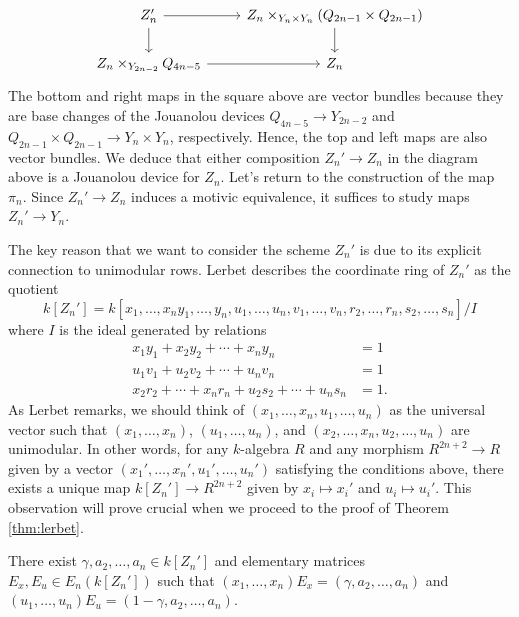 \[\begin{tikzcd}
	{Z_n'} & {Z_n \times_{Y_n \times Y_n}(Q_{2n-1} \times Q_{2n-1})} \\
	{Z_n\times_{Y_{2n-2}}Q_{4n-5}} & {Z_n}
	\arrow[from=1-1, to=1-2]
	\arrow[from=1-1, to=2-1]
	\arrow[from=1-2, to=2-2]
	\arrow[from=2-1, to=2-2]
\end{tikzcd}\]
The bottom and right maps in the square above are vector bundles because they are base changes of the Jouanolou devices $Q_{4n-5}\to Y_{2n-2}$ and $Q_{2n-1} \times Q_{2n-1} \to Y_n \times Y_n$, respectively. Hence, the top and left maps are also vector bundles. We deduce that either composition $Z_n' \to Z_n$ in the diagram above is a Jouanolou device for $Z_n$. Let's return to the construction of the map $\pi_n$. Since $Z_n' \to Z_n$ induces a motivic equivalence, it suffices to study maps $Z_n' \to Y_n$. 

The key reason that we want to consider the scheme $Z_n'$ is due to its explicit connection to unimodular rows. Lerbet \cite[pg. 27]{LERBET2024109415} describes the  coordinate ring of $Z_n'$ as the quotient 
\[
k[Z_n'] = k[x_1,\ldots,x_ny_1,\ldots,y_n,u_1,\ldots,u_n,v_1,\ldots,v_n,r_2,\ldots,r_n,s_2,\ldots,s_n]/I
\]
where $I$ is the ideal generated by relations
\begin{align*}
    x_1y_1 + x_2y_2 + \cdots + x_ny_n &= 1 \\
    u_1v_1 + u_2v_2 + \cdots + u_nv_n &= 1 \\
    x_2r_2 + \cdots + x_nr_n + u_2s_2 + \cdots + u_ns_n &= 1.
\end{align*}
As Lerbet remarks, we should think of $(x_1,\ldots,x_n,u_1,\ldots,u_n)$ as the universal vector such that $(x_1,\ldots,x_n)$, $(u_1,\ldots,u_n)$, and $(x_2,\ldots,x_n,u_2,\ldots,u_n)$ are unimodular. In other words, for any $k$-algebra $R$ and any morphism $R^{2n+2} \to R$ given by a vector $(x_1',\ldots,x_n',u_1',\ldots,u_n')$ satisfying the conditions above, there exists a unique map $k[Z_n'] \to R^{2n+2}$ given by $x_i \mapsto x_i'$ and $u_i \mapsto u_i'$. This observation will prove crucial when we proceed to the proof of Theorem \ref{thm:lerbet}.

\begin{lemma}\label{lem:univ_mn}
    There exist $\gamma,a_2,\ldots,a_n \in k[Z_n']$ and elementary matrices $E_x,E_u \in E_n(k[Z_n'])$ such that $(x_1,\ldots,x_n)E_x = (\gamma,a_2,\ldots,a_n)$ and $(u_1,\ldots,u_n)E_u = (1-\gamma,a_2,\ldots,a_n)$.
\end{lemma}

